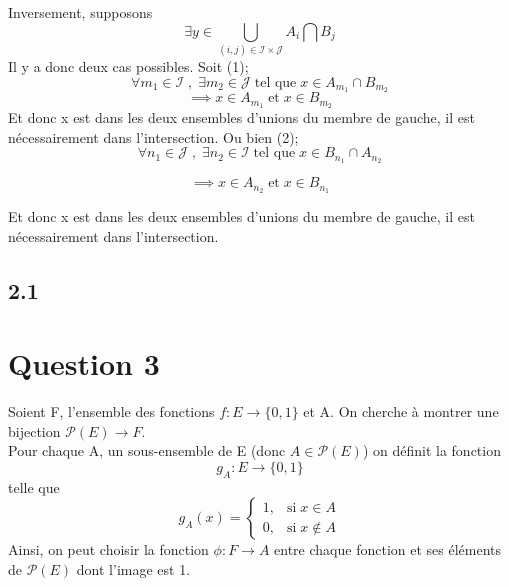 \documentclass[letterpaper,12pt,oneside,final]{book}
\begin{document}
Inversement, supposons
\begin{equation*}
    \exists y \in \bigcup_{(i,j)\in \mathcal{I}\times\mathcal{J}}A_i \bigcap B_j
\end{equation*}
Il y a donc deux cas possibles. Soit (1);
\begin{equation}
    \forall m_1 \in \mathcal{I}\;, \; \exists m_2 \in \mathcal{J}\; \text{tel que} \; x\in A_{m_1} \cap B_{m_2}
\end{equation}
\begin{equation*}
    \implies x \in A_{m_1} \; \text{et} \; x \in B_{m_2}
\end{equation*}
Et donc x est dans les deux ensembles d'unions du membre de gauche, il est nécessairement dans l'intersection.
Ou bien (2);
\begin{equation}
    \forall n_1 \in \mathcal{J}\;, \; \exists n_2 \in \mathcal{I}\; \text{tel que} \; x\in B_{n_1} \cap A_{n_2}
\end{equation}
 
\begin{equation*}
\implies x \in A_{n_2} \; \text{et} \; x \in B_{n_1}
\end{equation*}

Et donc x est dans les deux ensembles d'unions du membre de gauche, il est nécessairement dans l'intersection. \\


\subsection*{2.1}



\newpage
\section*{Question 3}
Soient F, l'ensemble des fonctions $ f: E \rightarrow \{0,1\}$ et A. On cherche à montrer une bijection
$\mathcal{P}(E) \rightarrow F  $.\\

Pour chaque A, un sous-ensemble de E (donc $A\in \mathcal{P}(E)$) on définit la fonction
\begin{equation*}
    g_A: E \rightarrow \{0,1\}
\end{equation*}
telle que 
\begin{equation*}
g_A(x)=
\begin{cases}
    1, &\text{si}\; x \in A\\
    0, & \text{si}\; x\notin A
\end{cases}
\end{equation*}
Ainsi, on peut choisir la fonction $\phi : F \rightarrow A$ entre chaque fonction et ses éléments de $\mathcal{P}(E)$ dont l'image est 1.
\end{document}
